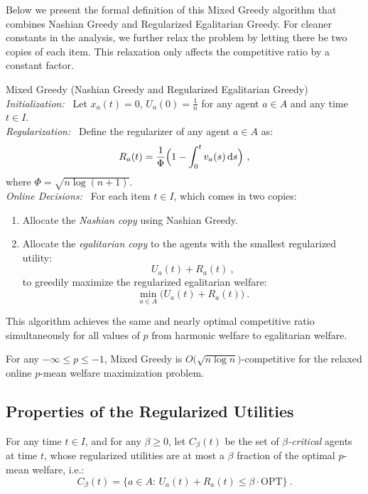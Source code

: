 \documentclass[11pt,letterpaper]{article}
\newcommand{\OPT}{\mathrm{OPT}}
\newcommand{\dif}[1]{\,\text{\rm d} #1}
\newcommand{\utility}{U}
\newcommand{\regularizer}{R}
\begin{document}
Below we present the formal definition of this Mixed Greedy algorithm that combines Nashian Greedy and Regularized Egalitarian Greedy.
For cleaner constants in the analysis, we further relax the problem by letting there be two copies of each item.
This relaxation only affects the competitive ratio by a constant factor.



\begin{algorithm}{Mixed Greedy (Nashian Greedy and Regularized Egalitarian Greedy)}
	\emph{Initialization:~}
	Let $x_a(t) = 0$, $\utility_a(0) = \frac{1}{n}$ for any agent $a \in A$ and any time $t \in I$.\\[2ex]
	\emph{Regularization:~}
	Define the regularizer of any agent $a \in A$ as:
	\[
	\regularizer_a(t) = \frac{1}{\Phi} 
	\Big(1 - \int_0^t v_a(s) \dif{s} \Big)
	~,
	\]
	where $\Phi = \sqrt{n \log(n+1)}$.\\[2ex]
	\emph{Online Decisions:~}
	For each item $t \in I$, which comes in two copies:
	\begin{enumerate}
	\item Allocate the \emph{Nashian copy} using Nashian Greedy.
	\item Allocate the \emph{egalitarian copy} to the agents with the smallest regularized utility:
		\[
			\utility_a(t) + \regularizer_a(t)
			~,
		\]
		to greedily maximize the regularized egalitarian welfare:
		\[
			\min_{a \in A} \big( \utility_a(t) + \regularizer_a(t) \big)
			~.
		\]
	\end{enumerate}
\end{algorithm}

This algorithm achieves the same and nearly optimal competitive ratio simultaneously for all values of $p$ from harmonic welfare to egalitarian welfare.


\begin{theorem}
	\label{thm:harmonic-to-egalitarian}
	For any $-\infty \le p \le -1$, Mixed Greedy is $O \big( \sqrt{n \log n} \big)$-competitive for the relaxed online $p$-mean welfare maximization problem.
\end{theorem}


\subsection{Properties of the Regularized Utilities}







\begin{definition}
\label{def:critical}
	For any time $t \in I$, and for any $\beta  \geq 0$, let $C_\beta(t)$ be the set of \emph{$\beta$-critical} agents at time $t$, whose regularized utilities are at most a $\beta$ fraction of the optimal $p$-mean welfare, i.e.:
	\[
		C_{\beta}(t) = \Big\{a\in A:\,\utility_a(t)+\regularizer_a(t) \leq \beta \cdot \OPT \Big\}
		~.
	\]
\end{definition}
\end{document}
